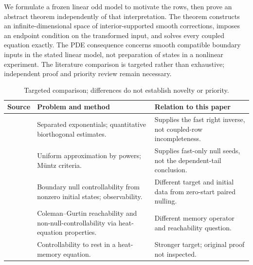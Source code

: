 We formulate a frozen linear odd model to motivate the rows, then prove an abstract theorem independently of that interpretation. The theorem constructs an infinite-dimensional space of interior-supported smooth corrections, imposes an endpoint condition on the transformed input, and solves every coupled equation exactly. The PDE consequence concerns smooth compatible boundary inputs in the stated linear model, not preparation of states in a nonlinear experiment. The literature comparison is targeted rather than exhaustive; independent proof and priority review remain necessary.

\begin{table}[htbp]
\centering\small
\begin{tabular}{@{}p{.20\linewidth}p{.36\linewidth}p{.36\linewidth}@{}}
\toprule
Source & Problem and method & Relation to this paper \\
\midrule
\cite{Cannarsa2020} & Separated exponentials; quantitative biorthogonal estimates. & Supplies the fast right inverse, not coupled-row incompleteness. \\
\cite{Almira2007} & Uniform approximation by powers; M\"untz criteria. & Supplies fast-only null seeds, not the dependent-tail conclusion. \\
\cite{Guerrero2013} & Boundary null controllability from nonzero initial states; observability. & Different target and initial data from zero-start paired nulling. \\
\cite{HalanayPandolfi2015} & Coleman--Gurtin reachability and non-null-controllability via heat-equation properties. & Different memory operator and reachability question. \\
\cite{IvanovPandolfi2009} & Controllability to rest in a heat-memory equation. & Stronger target; original proof not inspected. \\
\bottomrule
\end{tabular}
\caption{Targeted comparison; differences do not establish novelty or priority.}\label{tab:literature}
\end{table}
